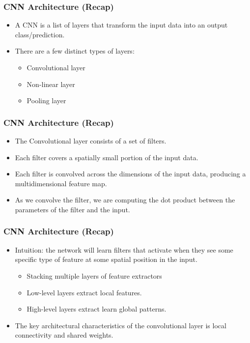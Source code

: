 \begin{frame}[fragile] \frametitle{CNN Architecture (Recap)}
\begin{itemize}
\item A CNN is a list of layers that transform the input data into an output class/prediction.
\item There are a few distinct types of layers:
\begin{itemize}
\item Convolutional layer
\item Non-linear layer
\item Pooling layer
\end{itemize}
\end{itemize}
\end{frame}

\begin{frame}[fragile] \frametitle{CNN Architecture (Recap)}

\begin{itemize}
\item The Convolutional layer consists of a set of filters.
\item Each filter covers a spatially small portion of the input data.
\item Each filter is convolved across the dimensions of the input data, producing a multidimensional feature map.
\item As we convolve the filter, we are computing the dot product between the parameters of the filter and the input.
\end{itemize}
\end{frame}


\begin{frame}[fragile] \frametitle{CNN Architecture (Recap)}

\begin{itemize}
\item Intuition: the network will learn filters that activate when they see some specific type of feature at some spatial position in the input.
\begin{itemize}
\item Stacking multiple layers of feature extractors
\item Low-level layers extract local features.
\item High-level layers extract learn global patterns.
\end{itemize}
\item The key architectural characteristics of the convolutional layer is local connectivity and shared weights.
\end{itemize}
\end{frame}





